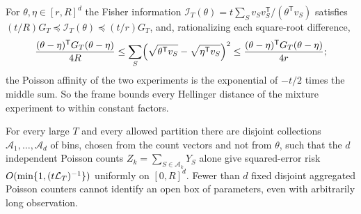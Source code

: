 For $\theta,\eta\in[r,R]^d$ the Fisher information
$\mathcal I_T(\theta)=t\sum_Sv_Sv_S^{\mathsf T}/(\theta^{\mathsf T}v_S)$ satisfies $(t/R)G_T\preceq\mathcal I_T(\theta)\preceq(t/r)G_T$, and,
rationalizing each square-root difference,
\begin{equation}\label{chz:eq:mixhellinger}
 \frac{(\theta-\eta)^{\mathsf T}G_T(\theta-\eta)}{4R}\le\sum_S\Bigl(\sqrt{\theta^{\mathsf T}v_S}-\sqrt{\eta^{\mathsf T}v_S}\Bigr)^2\le\frac{(\theta-\eta)^{\mathsf T}G_T(\theta-\eta)}{4r};
\end{equation}
the Poisson affinity of the two experiments is the exponential of $-t/2$ times the middle sum. So the frame bounds
every Hellinger distance of the mixture experiment to within constant factors.

\begin{theorem}\label{chz:thm:counters}
For every large $T$ and every allowed partition there are disjoint collections $\mathcal A_1,\dots,\mathcal A_d$ of bins,
chosen from the count vectors and not from $\theta$, such that the $d$ independent Poisson counts
$Z_k=\sum_{S\in\mathcal A_k}Y_S$ alone give squared-error risk $O(\min\{1,(t\mathcal L_T)^{-1}\})$ uniformly on $[0,R]^d$. Fewer than
$d$ fixed disjoint aggregated Poisson counters cannot identify an open box of parameters, even with arbitrarily long
observation.
\end{theorem}

